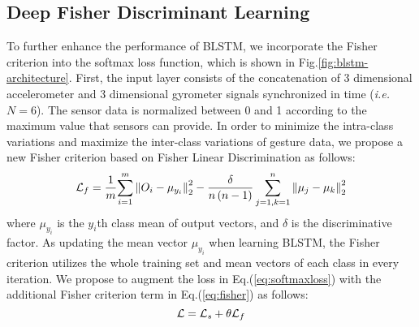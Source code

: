 \documentclass[review]{elsarticle}
\begin{document}
\subsection{Deep Fisher Discriminant Learning }\label{sec:fisherloss}

To further enhance the performance of BLSTM, we incorporate the Fisher criterion into the softmax loss function, which is shown in Fig.\;\ref{fig:blstm-architecture}. First, the input layer consists of the concatenation of 3 dimensional accelerometer and 3 dimensional gyrometer signals synchronized in time (\emph{i.e.} $N=6$). The sensor data is normalized between 0 and 1 according to the maximum value that sensors can provide.
In order to minimize the intra-class variations and maximize the inter-class variations of gesture data, we propose a new Fisher criterion based on Fisher Linear Discrimination as follows:
\begin{equation}{\cal L}_f
	= \frac{1}{m}{\sum\limits_{i = 1}^m {\left\| {{O_i} - {\mu_{{y_i}}}} \right\|_2^2}  - \frac{\delta}{n\left(n-1\right)} \sum\limits_{j = 1,k = 1}^n {\left\| {{\mu_j} - {\mu_k}} \right\|_2^2} }
	\label{eq:fisher}
\end{equation}
where ${\mu_{{y_i}}}$ is the $y_i$th class mean of output vectors, and $\delta$ is the discriminative factor. As updating the mean vector ${\mu_{{y_i}}}$ when learning BLSTM, the Fisher criterion utilizes the whole training set and mean vectors of each class in every iteration. We propose to augment the loss in Eq.\;(\ref{eq:softmaxloss}) with the additional Fisher criterion term in Eq.\;(\ref{eq:fisher}) as follows:
\begin{equation}
	{\cal L} 
	= {\cal L}_s +\theta{\cal L}_f \\
	\label{eq:wholeloss}
\end{equation}
\end{document}
